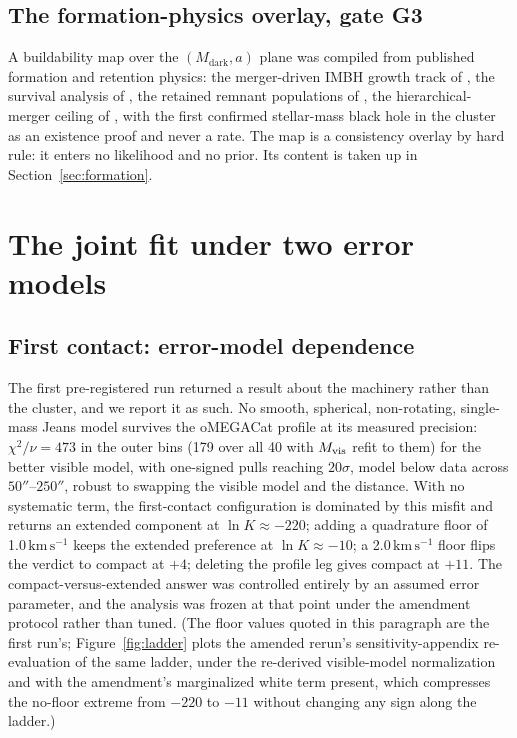 \documentclass[11pt]{article}
\newcommand{\mdark}{\ensuremath{M_{\mathrm{dark}}}}
\newcommand{\lnK}{\ensuremath{\ln K}}
\newcommand{\kms}{\ensuremath{\mathrm{km\,s^{-1}}}}
\begin{document}
\subsection{The formation-physics overlay, gate G3}
\label{sec:g3sec}

A buildability map over the $(\mdark, a)$ plane was compiled from published formation and retention physics: the merger-driven IMBH growth track of \citet{GonzalezPrieto2025}, the survival analysis of \citet{Martinez2026}, the retained remnant populations of \citet{Dickson2023,Dickson2024}, the hierarchical-merger ceiling of \citet{Colossus2025}, with the first confirmed stellar-mass black hole in the cluster \citep{Whitaker2026BH2} as an existence proof and never a rate. The map is a consistency overlay by hard rule: it enters no likelihood and no prior. Its content is taken up in Section~\ref{sec:formation}.

\section{The joint fit under two error models}
\label{sec:fit}

\subsection{First contact: error-model dependence}
\label{sec:fit1}

The first pre-registered run returned a result about the machinery rather than the cluster, and we report it as such. No smooth, spherical, non-rotating, single-mass Jeans model survives the oMEGACat profile at its measured precision: $\chi^{2}/\nu = 473$ in the outer bins (179 over all 40 with $M_{\rm vis}$ refit to them) for the better visible model, with one-signed pulls reaching $20\sigma$, model below data across $50''$--$250''$, robust to swapping the visible model and the distance. With no systematic term, the first-contact configuration is dominated by this misfit and returns an extended component at $\lnK \approx -220$; adding a quadrature floor of 1.0\,\kms{} keeps the extended preference at $\lnK \approx -10$; a 2.0\,\kms{} floor flips the verdict to compact at $+4$; deleting the profile leg gives compact at $+11$. The compact-versus-extended answer was controlled entirely by an assumed error parameter, and the analysis was frozen at that point under the amendment protocol rather than tuned. (The floor values quoted in this paragraph are the first run's; Figure~\ref{fig:ladder} plots the amended rerun's sensitivity-appendix re-evaluation of the same ladder, under the re-derived visible-model normalization and with the amendment's marginalized white term present, which compresses the no-floor extreme from $-220$ to $-11$ without changing any sign along the ladder.)
\end{document}
